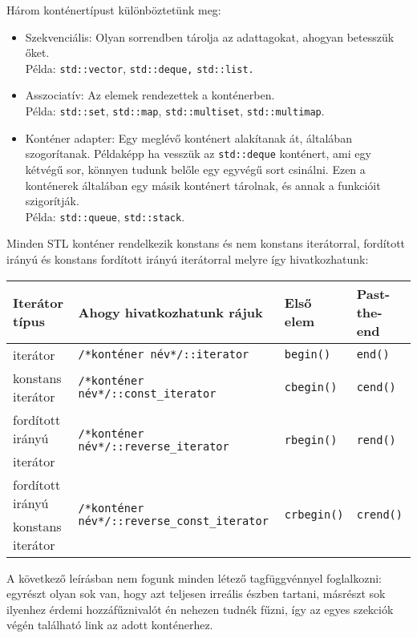 \documentclass[a4paper,11.5pt,table]{article}
\begin{document}
	Három konténertípust különböztetünk meg:
	\begin{itemize}
		\item Szekvenciális: Olyan sorrendben tárolja az adattagokat, ahogyan betesszük őket. \\Példa: \texttt{std::vector}, \texttt{std::deque,} \texttt{std::list.}
		\item Asszociatív: Az elemek rendezettek a konténerben.\\ Példa: \texttt{std::set}, \texttt{std::map}, \texttt{std::multiset}, \texttt{std::multimap}.
		\item Konténer adapter: Egy meglévő konténert alakítanak át, általában szogorítanak. Példaképp ha vesszük az \texttt{std::deque} konténert, ami egy kétvégű sor, könnyen tudunk belőle egy egyvégű sort csinálni. Ezen a konténerek általában egy másik konténert tárolnak, és annak a funkcióit szigorítják.
		\\Példa: \texttt{std::queue}, \texttt{std::stack}.
	\end{itemize}
	Minden STL konténer rendelkezik konstans és nem konstans iterátorral, fordított irányú és konstans fordított irányú iterátorral melyre így hivatkozhatunk:
	\begin{center}
		\setlength{\extrarowheight}{2pt}
		\begin{tabular}{|l|l|l|l|}
			\hline
			Iterátor típus&Ahogy hivatkozhatunk rájuk&Első elem&Past-the-end\\
			\hline
			\hline
			iterátor&\texttt{/*konténer név*/::iterator}&\texttt{begin()}&\texttt{end()}\\
			\hline
			konstans iterátor&\texttt{/*konténer név*/::const\_iterator}&\texttt{cbegin()}&\texttt{cend()}\\
			\hline
			fordított irányú&\multirow{2}{*}{\texttt{/*konténer név*/::reverse\_iterator}}&\multirow{2}{*}{\texttt{rbegin()}}&\multirow{2}{*}{\texttt{rend()}}\\
			iterátor&&&\\
			\hline
			fordított irányú&\multirow{2}{*}{\texttt{/*konténer név*/::reverse\_const\_iterator}}&\multirow{2}{*}{\texttt{crbegin()}}&\multirow{2}{*}{\texttt{crend()}}\\
			konstans iterátor&&&\\
			\hline
		\end{tabular}
	\end{center}
	
	A következő leírásban nem fogunk minden létező tagfüggvénnyel foglalkozni: egyrészt olyan sok van, hogy azt teljesen irreális észben tartani, másrészt sok ilyenhez érdemi hozzáfűznivalót én nehezen tudnék fűzni, így az egyes szekciók végén található link az adott konténerhez.
	
\end{document}

